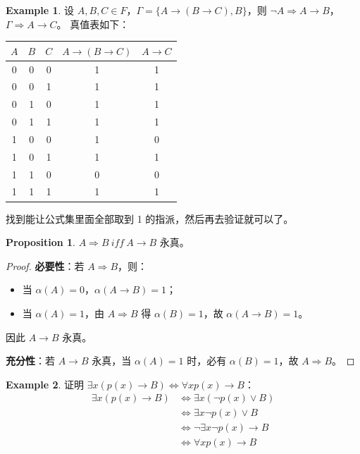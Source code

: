 \documentclass[oneside]{book}
\theoremstyle{definition}
\newtheorem{example}{Example}[section]
\newtheorem{proposition}{Proposition}[section]
\begin{document}
\begin{example}
	设 \( A,B,C \in F \)，\( \Gamma = \{ A \to (B \to C) ,B\} \)，则 \( \neg A \Rightarrow A \to B \)，\( \Gamma \Rightarrow A \to C \)。
	真值表如下：
	\begin{center}
		\begin{tabular}{|c|c|c|c|c|}
			\hline
			\( A \) & \( B \) & \( C \) & \( A \to (B \to C) \) & \( A \to C \) \\
			\hline
			0 & 0 & 0 & 1 & 1 \\
			0 & 0 & 1 & 1 & 1 \\
			0 & 1 & 0 & 1 & 1 \\
			0 & 1 & 1 & 1 & 1 \\
			1 & 0 & 0 & 1 & 0 \\
			1 & 0 & 1 & 1 & 1 \\
			1 & 1 & 0 & 0 & 0 \\
			1 & 1 & 1 & 1 & 1 \\
			\hline
		\end{tabular}
	\end{center}
	找到能让公式集里面全部取到 1 的指派，然后再去验证就可以了。
\end{example}

\begin{proposition}
	\( A \Rightarrow B\ iff\ A \to B \) 永真。
\end{proposition}

\begin{proof}
	\textbf{必要性}：若 \( A \Rightarrow B \)，则：
	\begin{itemize}
		\item 当 \( \alpha(A)=0 \)，\( \alpha(A \to B)=1 \)；
		\item 当 \( \alpha(A)=1 \)，由 \( A \Rightarrow B \) 得 \( \alpha(B)=1 \)，故 \( \alpha(A \to B)=1 \)。
	\end{itemize}
	因此 \( A \to B \) 永真。
	
	\textbf{充分性}：若 \( A \to B \) 永真，当 \( \alpha(A)=1 \) 时，必有 \( \alpha(B)=1 \)，故 \( A \Rightarrow B \)。
\end{proof}

\begin{example}
	证明 \( \exists x (p(x) \to B) \iff \forall x p(x) \to B \)：
	\[
	\begin{aligned}
		\exists x (p(x) \to B) &\iff \exists x (\neg p(x) \lor B) \\
		&\iff \exists x \neg p(x) \lor B \\
		&\iff \neg \exists x \neg p(x) \to B\\
		&\iff \forall x p(x) \to B 		
	\end{aligned}
	\]
\end{example}
\end{document}
